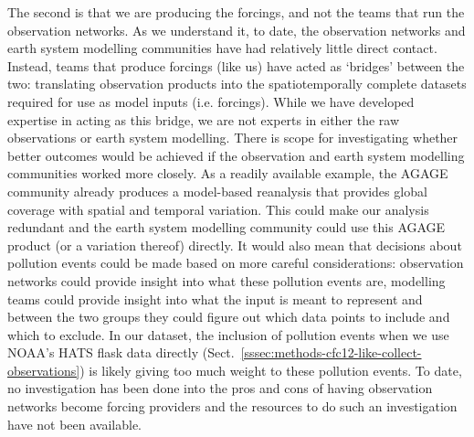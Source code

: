 The second is that we are producing the forcings, and not the teams that run the observation networks.
As we understand it, to date, the observation networks and earth system modelling communities have had relatively little direct contact.
Instead, teams that produce forcings (like us) have acted as `bridges' between the two:
translating observation products into the spatiotemporally complete datasets required for use as model inputs (i.e. forcings).
While we have developed expertise in acting as this bridge,
we are not experts in either the raw observations or earth system modelling.
There is scope for investigating whether better outcomes would be achieved if the observation and earth system modelling communities worked more closely.
As a readily available example, the AGAGE community already produces a model-based reanalysis
that provides global coverage with spatial and temporal variation.
This could make our analysis redundant and the earth system modelling community could use this AGAGE product (or a variation thereof) directly.
It would also mean that decisions about pollution events could be made based on more careful considerations:
observation networks could provide insight into what these pollution events are,
modelling teams could provide insight into what the input is meant to represent
and between the two groups they could figure out which data points to include and which to exclude.
In our dataset, the inclusion of pollution events when we use NOAA's HATS flask data directly (Sect.~\ref{sssec:methods-cfc12-like-collect-observations})
is likely giving too much weight to these pollution events.
To date, no investigation has been done into the pros and cons of having observation networks become forcing providers
and the resources to do such an investigation have not been available.

